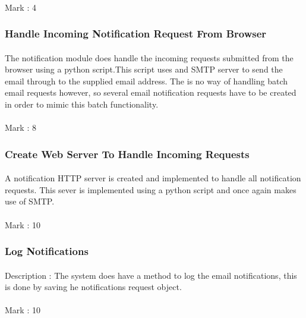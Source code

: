 \documentclass[11pt]{article}
\begin{document}
\paragraph{} Mark : 4

\subsubsection{Handle Incoming Notification Request From Browser}
\paragraph{} The notification module does handle the incoming requests submitted from the browser using a python script.This script uses and SMTP server to send the email through to the supplied email address. The is no way of handling batch email requests however, so several email notification requests have to be created in order to mimic this batch functionality.
\paragraph{} Mark : 8

\subsubsection{Create Web Server To Handle Incoming Requests} 
\paragraph{} A notification HTTP server is created and implemented to handle all notification requests. This sever is implemented using a python script and once again makes use of SMTP.
\paragraph{} Mark : 10

\subsubsection{Log Notifications} 
\paragraph{} Description : The system does have a method to log the email notifications, this is done by saving he notifications request object.
\paragraph{} Mark : 10
\end{document}
